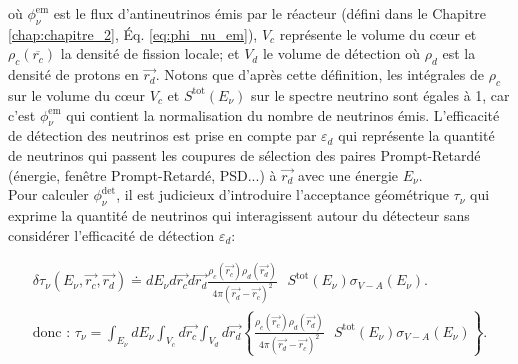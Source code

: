\bigbreak

où $\phi_\nu^{\textrm{em}}$ est le flux d'antineutrinos émis par le réacteur (défini dans le Chapitre \ref{chap:chapitre_2}, Éq. \ref{eq:phi_nu_em}), $V_c$ représente le volume du c\oe ur et $\rho_c(\overline{r_c})$ la densité de fission locale; et $V_d$ le volume de détection où $\rho_d$ est la densité de protons en $\overrightarrow{r_d}$. Notons que d'après cette définition, les intégrales de $\rho_c$ sur le volume du c\oe ur $V_c$ et $S^\textrm{tot}(E_\nu)$ sur le spectre neutrino sont égales à 1, car c'est $\phi_\nu^{\textrm{em}}$ qui contient la normalisation du nombre de neutrinos émis. L'efficacité de détection des neutrinos est prise en compte par $\varepsilon_d$ qui représente la quantité de neutrinos qui passent les coupures de sélection des paires Prompt-Retardé (énergie, fenêtre Prompt-Retardé, PSD...) à $\overrightarrow{r_d}$ avec une énergie $E_\nu$.\\

Pour calculer $\phi_\nu^{\textrm{det}}$, il est judicieux d'introduire l'acceptance géométrique $\tau_\nu$ qui exprime la quantité de neutrinos qui interagissent autour du détecteur sans considérer l'efficacité de détection $\varepsilon_d$:

\begin{equation}
\begin{gathered}
    \delta \tau_\nu(E_\nu,\overrightarrow{r_c},\overrightarrow{r_d}) \doteq dE_\nu d\overrightarrow{r_c} d\overrightarrow{r_d} \frac{\rho_c(\overrightarrow{r_c})\rho_d(\overrightarrow{r_d})}{4\pi (\overrightarrow{r_d} - \overrightarrow{r_c})^2}\textrm{ } S^\textrm{tot}(E_\nu) \sigma_{V-A}(E_\nu).\\
    \textrm{donc : } \tau_\nu = \int_{E_\nu} dE_\nu \int_{V_c} d\overrightarrow{r_c} \int_{V_d} d\overrightarrow{r_d} \left\{ \frac{\rho_c(\overrightarrow{r_c})\rho_d(\overrightarrow{r_d})}{4 \pi (\overrightarrow{r_d} - \overrightarrow{r_c})^2} \textrm{ } S^\textrm{tot}(E_\nu) \sigma_{V-A}(E_\nu) \right\} .
\end{gathered}
\end{equation}

\bigbreak

